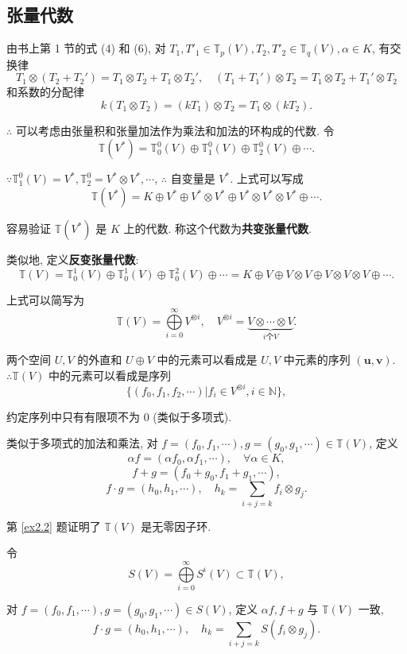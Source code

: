 \documentclass[color=black,device=normal,lang=cn,mode=geye]{elegantnote}
\begin{document}
\subsection{张量代数}
由书上第 1 节的式 (4) 和 (6), 对 $T_1,T'_1\in\mathbb{T}_p(V),T_2,T'_2\in\mathbb{T}_q(V),\alpha\in K$, 有交换律
\[T_1\otimes(T_2+T_2')=T_1\otimes T_2+T_1\otimes T_2',\quad (T_1+T_1')\otimes T_2=T_1\otimes T_2+T_1'\otimes T_2\]
和系数的分配律
\[k(T_1\otimes T_2)=(kT_1)\otimes T_2=T_1\otimes(kT_2).\]

$\therefore$ 可以考虑由张量积和张量加法作为乘法和加法的环构成的代数. 令
\[\mathbb{T}(V^*)=\mathbb{T}_0^0(V)\oplus\mathbb{T}_1^0(V)\oplus\mathbb{T}_2^0(V)\oplus\cdots.\]

$\because\mathbb{T}_1^0(V)=V^*,\mathbb{T}_2^0=V^*\otimes V^*,\cdots$, $\therefore$ 自变量是 $V^*$. 上式可以写成
\[\mathbb{T}(V^*)=K\oplus V^*\oplus V^*\otimes V^*\oplus V^*\otimes V^*\otimes V^*\oplus\cdots.\]

容易验证 $\mathbb{T}(V^*)$ 是 $K$ 上的代数. 称这个代数为\textbf{共变张量代数}.

类似地, 定义\textbf{反变张量代数}:
\[\mathbb{T}(V)=\mathbb{T}_0^1(V)\oplus\mathbb{T}_0^1(V)\oplus\mathbb{T}_0^2(V)\oplus\cdots=K\oplus V\oplus V\otimes V\oplus V\otimes V\otimes V\oplus\cdots.\]

上式可以简写为
\[\mathbb{T}(V)=\bigoplus\limits_{i=0}^\infty V^{\otimes i},\quad V^{\otimes i}=\underbrace{V\otimes\cdots\otimes V}_{i\text{个}V}.\]

两个空间 $U,V$ 的外直和 $U\oplus V$ 中的元素可以看成是 $U,V$ 中元素的序列 $(\boldsymbol{u},\boldsymbol{v})$. $\therefore\mathbb{T}(V)$ 中的元素可以看成是序列
\[\{(f_0,f_1,f_2,\cdots)|f_i\in V^{\otimes i},i\in\mathbb{N}\},\]

约定序列中只有有限项不为 $0$ (类似于多项式).

类似于多项式的加法和乘法, 对 $f=(f_0,f_1,\cdots),g=(g_0,g_1,\cdots)\in\mathbb{T}(V)$, 定义
\[\alpha f=(\alpha f_0,\alpha f_1,\cdots),\quad\forall\alpha\in K,\]
\[f+g=(f_0+g_0,f_1+g_1,\cdots),\]
\[f\cdot g=(h_0,h_1,\cdots),\quad h_k=\sum\limits_{i+j=k}f_i\otimes g_j.\]

第 \ref{ex2.2} 题证明了 $\mathbb{T}(V)$ 是无零因子环.

令
\[S(V)=\bigoplus\limits_{i=0}^\infty S^i(V)\subset\mathbb{T}(V),\]

对 $f=(f_0,f_1,\cdots),g=(g_0,g_1,\cdots)\in S(V)$, 定义 $\alpha f,f+g$ 与 $\mathbb{T}(V)$ 一致,
\[f\cdot g=(h_0,h_1,\cdots),\quad h_k=\sum\limits_{i+j=k}S(f_i\otimes g_j).\]
\end{document}
